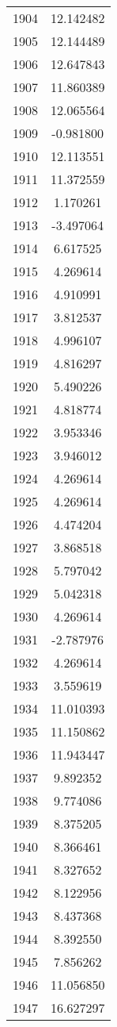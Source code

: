 \documentclass[12pt]{article}
\begin{document}
\begin{longtable}{@{}cc@{}}
1904 & 12.142482 \\
1905 & 12.144489 \\
1906 & 12.647843 \\
1907 & 11.860389 \\
1908 & 12.065564 \\
1909 & -0.981800 \\
1910 & 12.113551 \\
1911 & 11.372559 \\
1912 & 1.170261 \\
1913 & -3.497064 \\
1914 & 6.617525 \\
1915 & 4.269614 \\
1916 & 4.910991 \\
1917 & 3.812537 \\
1918 & 4.996107 \\
1919 & 4.816297 \\
1920 & 5.490226 \\
1921 & 4.818774 \\
1922 & 3.953346 \\
1923 & 3.946012 \\
1924 & 4.269614 \\
1925 & 4.269614 \\
1926 & 4.474204 \\
1927 & 3.868518 \\
1928 & 5.797042 \\
1929 & 5.042318 \\
1930 & 4.269614 \\
1931 & -2.787976 \\
1932 & 4.269614 \\
1933 & 3.559619 \\
1934 & 11.010393 \\
1935 & 11.150862 \\
1936 & 11.943447 \\
1937 & 9.892352 \\
1938 & 9.774086 \\
1939 & 8.375205 \\
1940 & 8.366461 \\
1941 & 8.327652 \\
1942 & 8.122956 \\
1943 & 8.437368 \\
1944 & 8.392550 \\
1945 & 7.856262 \\
1946 & 11.056850 \\
1947 & 16.627297 \\

\end{longtable}
\end{document}
